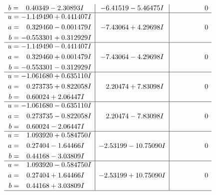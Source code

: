 \documentclass[1p]{elsarticle_modified}
\theoremstyle{definition}
\begin{document}
$$\begin{array}{c|c|c}
\begin{aligned}
b &= \phantom{-}0.40349 - 2.30893 I\end{aligned}
 & -6.41519 - 5.46475 I & \phantom{-0.000000 } 0 \\ \hline\begin{aligned}
u &= -1.149490 + 0.441407 I \\
a &= \phantom{-}0.329460 - 0.001479 I \\
b &= -0.553301 + 0.312929 I\end{aligned}
 & -7.43064 + 4.29698 I & \phantom{-0.000000 } 0 \\ \hline\begin{aligned}
u &= -1.149490 - 0.441407 I \\
a &= \phantom{-}0.329460 + 0.001479 I \\
b &= -0.553301 - 0.312929 I\end{aligned}
 & -7.43064 - 4.29698 I & \phantom{-0.000000 } 0 \\ \hline\begin{aligned}
u &= -1.061680 + 0.635110 I \\
a &= \phantom{-}0.273735 + 0.822058 I \\
b &= \phantom{-}0.60024 + 2.06447 I\end{aligned}
 & \phantom{-}2.20474 + 7.83098 I & \phantom{-0.000000 } 0 \\ \hline\begin{aligned}
u &= -1.061680 - 0.635110 I \\
a &= \phantom{-}0.273735 - 0.822058 I \\
b &= \phantom{-}0.60024 - 2.06447 I\end{aligned}
 & \phantom{-}2.20474 - 7.83098 I & \phantom{-0.000000 } 0 \\ \hline\begin{aligned}
u &= \phantom{-}1.093920 + 0.584750 I \\
a &= \phantom{-}0.27404 - 1.64466 I \\
b &= \phantom{-}0.44168 - 3.03809 I\end{aligned}
 & -2.53199 - 10.75090 I & \phantom{-0.000000 } 0 \\ \hline\begin{aligned}
u &= \phantom{-}1.093920 - 0.584750 I \\
a &= \phantom{-}0.27404 + 1.64466 I \\
b &= \phantom{-}0.44168 + 3.03809 I\end{aligned}
 & -2.53199 + 10.75090 I & \phantom{-0.000000 } 0\\
 \hline 
 \end{array}$$\newpage$$\begin{array}{c|c|c}  

\end{array}$$
\end{document}
